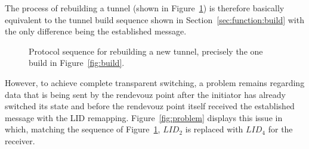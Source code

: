 \documentclass[paper=letter, fontsize=12pt]{article}
\begin{document}
The process of rebuilding a tunnel (shown in Figure~\ref{fig:rebuild}) is therefore basically equivalent to the tunnel build sequence shown in Section~\ref{sec:function:build} with the only difference being the established message.

\begin{figure}[ht]
    \caption{Protocol sequence for rebuilding a new tunnel, precisely the one build in Figure~\ref{fig:build}.}
    \label{fig:rebuild}
\end{figure}

However, to achieve complete transparent switching, a problem remains regarding data that is being sent by the rendevouz point after the initiator has already switched its state and before the rendevouz point itself received the established message with the LID remapping. Figure~\ref{fig:problem} displays this issue in which, matching the sequence of Figure~\ref{fig:rebuild}, $LID_2$ is replaced with $LID_4$ for the receiver.
\end{document}
